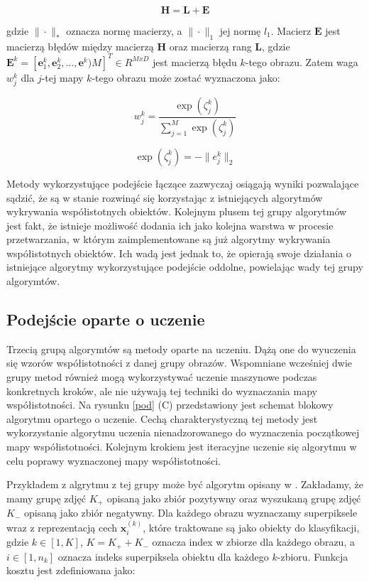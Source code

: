 \documentclass[a4paper,12pt,twoside,openany]{report}
\begin{document}
	$$
	\mathbf{H} = \mathbf{L} + \mathbf{E}
	$$

	gdzie $\|\cdot\|_*$ oznacza normę macierzy, a $\|\cdot\|_1$ jej normę $l_1$. Macierz $\mathbf{E}$ jest macierzą błędów między macierzą $\mathbf{H}$ oraz macierzą rang $\mathbf{L}$, gdzie $\mathbf{E}^k=[\mathbf{e}^k_1, \mathbf{e}^k_2, \dots, \mathbf{e}^k)M]^T \in R^{M x D}$ jest macierzą błędu $k$-tego obrazu. Zatem waga $w^k_j$ dla $j$-tej mapy $k$-tego obrazu może zostać wyznaczona jako:

	$$
	w^k_j = \frac{\exp(\zeta^k_j)}{\sum^M_{j=1}\exp(\zeta^k_j)}
	$$

	$$
	\exp(\zeta^k_j) = -\|e^k_j\|_2
	$$
	
	Metody wykorzystujące podejście łączące zazwyczaj osiągają wyniki pozwalające sądzić, że są w stanie rozwinąć się korzystając z istniejących algorytmów wykrywania współistotnych obiektów. Kolejnym plusem tej grupy algorytmów jest fakt, że istnieje możliwość dodania ich jako kolejna warstwa w procesie przetwarzania, w którym zaimplementowane są już algorytmy wykrywania współistotnych obiektów. Ich wadą jest jednak to, że opierają swoje działania o istniejące algorytmy wykorzystujące podejście oddolne, powielając wady tej grupy algorymtów.

	\subsection{Podejście oparte o uczenie}
	Trzecią grupą algorymtów są metody oparte na uczeniu. Dążą one do wyuczenia się wzorów współistotności z danej grupy obrazów. Wspomniane wcześniej dwie grupy metod również mogą wykorzystywać uczenie maszynowe podczas konkretnych kroków, ale nie używają tej techniki do wyznaczania mapy współistotności. Na rysunku \ref{pod} (C) przedstawiony jest schemat blokowy algorytmu opartego o uczenie. Cechą charakterystyczną tej metody jest wykorzystanie algorytmu uczenia nienadzorowanego do wyznaczenia początkowej mapy współistotności. Kolejnym krokiem jest iteracyjne uczenie się algorytmu w celu poprawy wyznaczonej mapy współistotności.

	Przykładem z algrytmu z tej grupy może być algorytm opisany w \cite{10.1109/TPAMI.2016.2567393}. Zakładamy, że mamy grupę zdjęć $K_+$ opisaną jako zbiór pozytywny oraz wyszukaną grupę zdjęć $K_-$ opisaną jako zbiór negatywny. Dla każdego obrazu wyznaczamy superpiksele wraz z reprezentacją cech $\mathbf{x}_i^{(k)}$, które traktowane są jako obiekty do klasyfikacji, gdzie $k \in [1, K]$, $K=K_+ + K_-$ oznacza index w zbiorze dla każdego obrazu, a $i \in [1, n_k]$ oznacza indeks superpiksela obiektu dla każdego $k$-zbioru. Funkcja kosztu jest zdefiniowana jako:
\end{document}
